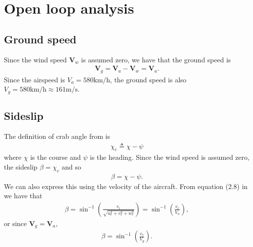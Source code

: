 \section{Open loop analysis}

\subsection{Ground speed}
Since the wind speed $\mathbf{V}_w$ is assumed zero, we have that the ground speed is
\begin{equation}\begin{aligned}
\label{eq:ground_air}
\mathbf{V}_g = \mathbf{V}_a - \mathbf{V}_w = \mathbf{V}_a.
\end{aligned}\end{equation}
Since the airspeed is $V_a = 580 \si{\kilo \meter / \hour}$, the ground speed is also $V_g = 580 \si{\kilo \meter / \hour} \approx 161 \si{\meter / \second}$.
\subsection{Sideslip}
The definition of crab angle from \cite{beard_mclain_2012} is
\begin{equation}\begin{aligned}
\chi_c \triangleq \chi - \psi
\end{aligned}\end{equation}
where $\chi$ is the course and $\psi$ is the heading. Since the wind speed is assumed zero, the sideslip $\beta = \chi_c$ and so
\begin{equation}\begin{aligned}
\beta = \chi - \psi.
\end{aligned}\end{equation}
We can also express this using the velocity of the aircraft. From equation (2.8) in \cite{beard_mclain_2012} we have that
\begin{equation}\begin{aligned}
\beta = \sin^{-1}\left(\frac{v_r}{\sqrt{u^2_r + v^2_r + w^2_r}}\right) = \sin^{-1}\left(\frac{v_r}{V_a}\right),
\end{aligned}\end{equation}
or since $\mathbf{V}_g = \mathbf{V}_a$,
\begin{equation}\begin{aligned}
\beta = \sin^{-1}\left(\frac{v_r}{V_g}\right).
\end{aligned}\end{equation}


